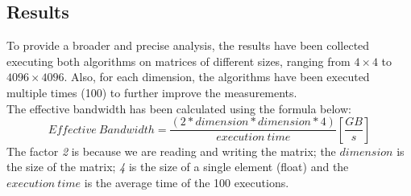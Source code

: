 \documentclass{article}
\begin{document}
\subsection{Results}
To provide a broader and precise analysis, the results have been collected executing both algorithms on matrices of different sizes,
ranging from $4 \times 4$ to $4096 \times 4096$. Also, for each dimension, the algorithms have been executed multiple times (100) to further improve the measurements. \\
The effective bandwidth has been calculated using the formula below: \\
\begin{equation*}
    Effective \: Bandwidth = \frac{\left ( \textit{2} * dimension * dimension * \textit{4} \right )}{execution\: time}
    \left[\frac{GB}{s}\right]
\end{equation*}
The factor \textit{2} is because we are reading and writing the matrix; the $dimension$ is the size of the matrix; 
\textit{4} is the size of a single element (float) and the $execution \: time$ is the average time of the 100 executions. \\
\end{document}
